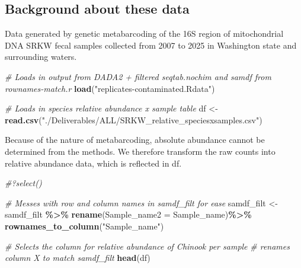 \documentclass[
]{article}
\newenvironment{Shaded}{\begin{snugshade}}{\end{snugshade}}
\newcommand{\AttributeTok}[1]{\textcolor[rgb]{0.13,0.29,0.53}{#1}}
\newcommand{\CommentTok}[1]{\textcolor[rgb]{0.56,0.35,0.01}{\textit{#1}}}
\newcommand{\FunctionTok}[1]{\textcolor[rgb]{0.13,0.29,0.53}{\textbf{#1}}}
\newcommand{\NormalTok}[1]{#1}
\newcommand{\OtherTok}[1]{\textcolor[rgb]{0.56,0.35,0.01}{#1}}
\newcommand{\SpecialCharTok}[1]{\textcolor[rgb]{0.81,0.36,0.00}{\textbf{#1}}}
\newcommand{\StringTok}[1]{\textcolor[rgb]{0.31,0.60,0.02}{#1}}
\begin{document}
\subsection{Background about these
data}\label{background-about-these-data}

Data generated by genetic metabarcoding of the 16S region of
mitochondrial DNA SRKW fecal samples collected from 2007 to 2025 in
Washington state and surrounding waters.

\begin{Shaded}
\begin{Highlighting}[]
\CommentTok{\# Loads in output from DADA2 + filtered seqtab.nochim and samdf from rownames{-}match.r}
\FunctionTok{load}\NormalTok{(}\StringTok{"replicates{-}contaminated.Rdata"}\NormalTok{)}

\CommentTok{\# Loads in species relative abundance x sample table}
\NormalTok{df }\OtherTok{\textless{}{-}} \FunctionTok{read.csv}\NormalTok{(}\StringTok{"./Deliverables/ALL/SRKW\_relative\_speciesxsamples.csv"}\NormalTok{)}
\end{Highlighting}
\end{Shaded}

Because of the nature of metabarcoding, absolute abundance cannot be
determined from the methods. We therefore transform the raw counts into
relative abundance data, which is reflected in df.

\begin{Shaded}
\begin{Highlighting}[]
\CommentTok{\#?select()}

\CommentTok{\# Messes with row and column names in samdf\_filt for ease}
\NormalTok{samdf\_filt }\OtherTok{\textless{}{-}}\NormalTok{ samdf\_filt }\SpecialCharTok{\%\textgreater{}\%}
  \FunctionTok{rename}\NormalTok{(}\AttributeTok{Sample\_name2 =}\NormalTok{ Sample\_name)}\SpecialCharTok{\%\textgreater{}\%}
  \FunctionTok{rownames\_to\_column}\NormalTok{(}\StringTok{"Sample\_name"}\NormalTok{)}

\CommentTok{\# Selects the column for relative abundance of Chinook per sample}
\CommentTok{\# renames column X to match samdf\_filt}
\FunctionTok{head}\NormalTok{(df)}
\end{Highlighting}
\end{Shaded}
\end{document}
